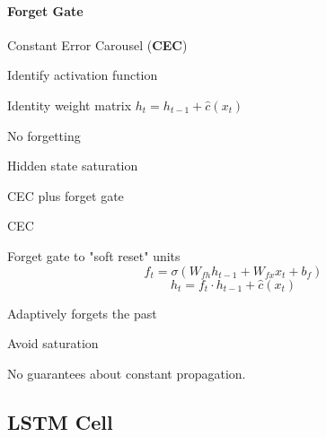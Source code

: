 \documentclass[10pt]{report}
\begin{document}
\paragraph{Forget Gate} Constant Error Carousel (\textbf{CEC})\begin{list}{}{}
	\item Identify activation function
	\item Identity weight matrix $h_t = h_{t-1} +\hat{c}(x_t)$
	\item No forgetting
	\item Hidden state saturation
\end{list}
CEC plus forget gate
\begin{list}{}{}
	\item CEC
	\item Forget gate to "soft reset" units
	$$f_t = \sigma(W_{fh}h_{t-1} + W_{fx}x_t + b_f)$$
	$$h_t = f_t\cdot h_{t-1} + \hat{c}(x_t)$$
	\item Adaptively forgets the past
	\item Avoid saturation
	\item No guarantees about constant propagation.
\end{list}
\subsection{LSTM Cell}
\end{document}

